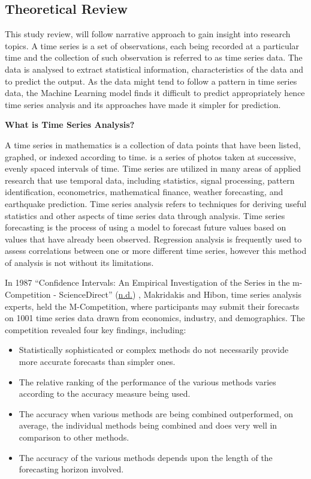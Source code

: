 \documentclass[12pt,a4paper]{book}
\begin{document}
{\hypertarget{theoretical-review}{%
\subsection{Theoretical Review}\label{theoretical-review}}

This study review, will follow narrative approach to gain insight into
research topics. A time series is a set of observations, each being
recorded at a particular time and the collection of such observation is
referred to as time series data. The data is analysed to extract
statistical information, characteristics of the data and to predict the
output. As the data might tend to follow a pattern in time series data,
the Machine Learning model finds it difficult to predict appropriately
hence time series analysis and its approaches have made it simpler for
prediction.

\textbf{What is Time Series Analysis?}

A time series in mathematics is a collection of data points that have
been listed, graphed, or indexed according to time. is a series of
photos taken at successive, evenly spaced intervals of time. Time series
are utilized in many areas of applied research that use temporal data,
including statistics, signal processing, pattern identification,
econometrics, mathematical finance, weather forecasting, and earthquake
prediction. Time series analysis refers to techniques for deriving
useful statistics and other aspects of time series data through
analysis. Time series forecasting is the process of using a model to
forecast future values based on values that have already been observed.
Regression analysis is frequently used to assess correlations between
one or more different time series, however this method of analysis is
not without its limitations.

In 1987 {``Confidence Intervals: An Empirical Investigation of the
Series in the m-Competition - ScienceDirect''}
(\protect\hyperlink{ref-confiden}{n.d.}) , Makridakis and Hibon, time
series analysis experts, held the M-Competition, where participants may
submit their forecasts on 1001 time series data drawn from economics,
industry, and demographics. The competition revealed four key findings,
including:

\begin{itemize}
\item
  Statistically sophisticated or complex methods do not necessarily
  provide more accurate forecasts than simpler ones.
\item
  The relative ranking of the performance of the various methods varies
  according to the accuracy measure being used.
\item
  The accuracy when various methods are being combined outperformed, on
  average, the individual methods being combined and does very well in
  comparison to other methods.
\item
  The accuracy of the various methods depends upon the length of the
  forecasting horizon involved.
\end{itemize}

}
\end{document}
